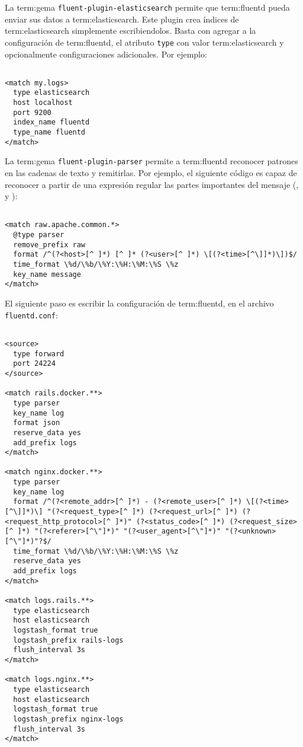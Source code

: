 La \gls{term:gema} \texttt{fluent-plugin-elasticsearch} permite que \gls{term:fluentd}
pueda enviar sus datos a \gls{term:elasticsearch}. Este plugin crea índices de
\gls{term:elasticsearch} simplemente escribiendolos. Basta con agregar a la
configuración de \gls{term:fluentd}, el atributo \lstinline{type} con valor
\gls{term:elasticsearch} y opcionalmente configuraciones adicionales. Por
ejemplo:

\begin{lstlisting}

<match my.logs>
  type elasticsearch
  host localhost
  port 9200
  index_name fluentd
  type_name fluentd
</match>

\end{lstlisting}

La \gls{term:gema} \texttt{fluent-plugin-parser} permite a \gls{term:fluentd}
reconocer patrones en las cadenas de texto y remitirlas. Por ejemplo, el
siguiente código es capaz de reconocer a partir de una expresión regular las
partes importantes del mensaje (,  y ):

\begin{lstlisting}

<match raw.apache.common.*>
  @type parser
  remove_prefix raw
  format /^(?<host>[^ ]*) [^ ]* (?<user>[^ ]*) \[(?<time>[^\]]*)\])$/
  time_format \%d/\%b/\%Y:\%H:\%M:\%S \%z
  key_name message
</match>

\end{lstlisting}

El siguiente paso es escribir la configuración de \gls{term:fluentd}, en el
archivo \texttt{fluentd.conf}:

\begin{lstlisting}

<source>
  type forward
  port 24224
</source>

<match rails.docker.**>
  type parser
  key_name log
  format json
  reserve_data yes
  add_prefix logs
</match>

<match nginx.docker.**>
  type parser
  key_name log
  format /^(?<remote_addr>[^ ]*) - (?<remote_user>[^ ]*) \[(?<time>[^\]]*)\] "(?<request_type>[^ ]*) (?<request_url>[^ ]*) (?<request_http_protocol>[^ ]*)" (?<status_code>[^ ]*) (?<request_size>[^ ]*) "(?<referer>[^\"]*)" "(?<user_agent>[^\"]*)" "(?<unknown>[^\"]*)"?$/
  time_format \%d/\%b/\%Y:\%H:\%M:\%S \%z
  reserve_data yes
  add_prefix logs
</match>

<match logs.rails.**>
  type elasticsearch
  host elasticsearch
  logstash_format true
  logstash_prefix rails-logs
  flush_interval 3s
</match>

<match logs.nginx.**>
  type elasticsearch
  host elasticsearch
  logstash_format true
  logstash_prefix nginx-logs
  flush_interval 3s
</match>

\end{lstlisting}


